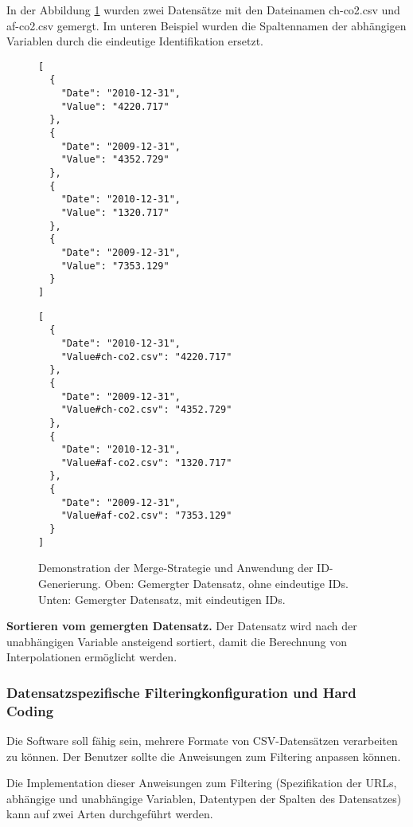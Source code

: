 In der Abbildung \ref{fig:merge} wurden zwei Datensätze mit den Dateinamen ch-co2.csv und af-co2.csv gemergt. Im unteren Beispiel wurden die Spaltennamen der abhängigen Variablen durch die eindeutige Identifikation ersetzt.

\begin{figure}[!htbp]
	\centering
	\begin{minipage}{0.40\textwidth}
		\centering
		\begin{verbatim}
[
  {
    "Date": "2010-12-31",
    "Value": "4220.717"
  },
  {
    "Date": "2009-12-31",
    "Value": "4352.729"
  },
  {
    "Date": "2010-12-31",
    "Value": "1320.717"
  },
  {
    "Date": "2009-12-31",
    "Value": "7353.129"
  }
]
		\end{verbatim}
	\end{minipage}\hfill
	\begin{minipage}{0.5\textwidth}
		\centering
		\begin{verbatim}
[
  {
    "Date": "2010-12-31",
    "Value#ch-co2.csv": "4220.717"
  },
  {
    "Date": "2009-12-31",
    "Value#ch-co2.csv": "4352.729"
  },
  {
    "Date": "2010-12-31",
    "Value#af-co2.csv": "1320.717"
  },
  {
    "Date": "2009-12-31",
    "Value#af-co2.csv": "7353.129"
  }
]
		\end{verbatim}
	\end{minipage}
	\caption[Merge-Strategie]{Demonstration der Merge-Strategie und Anwendung der ID-Generierung. Oben: Gemergter Datensatz, ohne eindeutige IDs. Unten: Gemergter Datensatz, mit eindeutigen IDs.}
	\label{fig:merge}
\end{figure}

\textbf{Sortieren vom gemergten Datensatz.} Der Datensatz wird nach der unabhängigen Variable ansteigend sortiert, damit die Berechnung von Interpolationen ermöglicht werden.

\subsubsection{Datensatzspezifische Filteringkonfiguration und Hard Coding}

Die Software soll fähig sein, mehrere Formate von CSV-Datensätzen verarbeiten zu können. Der Benutzer sollte die Anweisungen zum Filtering anpassen können.

Die Implementation dieser Anweisungen zum Filtering (Spezifikation der URLs, abhängige und unabhängige Variablen, Datentypen der Spalten des Datensatzes) kann auf zwei Arten durchgeführt werden.

